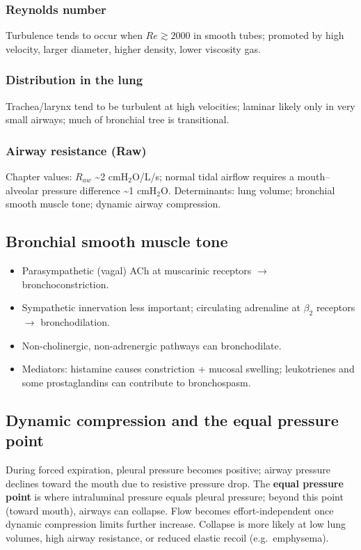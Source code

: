 \documentclass[11pt,a4paper]{article}
\begin{document}
\subsubsection{Reynolds number}
Turbulence tends to occur when $Re \gtrsim 2000$ in smooth tubes; promoted by high velocity, larger diameter, higher density, lower viscosity gas.

\subsubsection{Distribution in the lung}
Trachea/larynx tend to be turbulent at high velocities; laminar likely only in very small airways; much of bronchial tree is transitional.

\subsubsection{Airway resistance (Raw)}
Chapter values: $R_{aw}$ \textasciitilde 2 cmH$_2$O/L/s; normal tidal airflow requires a mouth--alveolar pressure difference \textasciitilde 1 cmH$_2$O.
Determinants: lung volume; bronchial smooth muscle tone; dynamic airway compression.

\subsection{Bronchial smooth muscle tone}
\begin{itemize}
  \item Parasympathetic (vagal) ACh at muscarinic receptors $\rightarrow$ bronchoconstriction.
  \item Sympathetic innervation less important; circulating adrenaline at $\beta_2$ receptors $\rightarrow$ bronchodilation.
  \item Non-cholinergic, non-adrenergic pathways can bronchodilate.
  \item Mediators: histamine causes constriction + mucosal swelling; leukotrienes and some prostaglandins can contribute to bronchospasm.
\end{itemize}

\subsection{Dynamic compression and the equal pressure point}
During forced expiration, pleural pressure becomes positive; airway pressure declines toward the mouth due to resistive pressure drop. The \textbf{equal pressure point} is where intraluminal pressure equals pleural pressure; beyond this point (toward mouth), airways can collapse.
Flow becomes effort-independent once dynamic compression limits further increase. Collapse is more likely at low lung volumes, high airway resistance, or reduced elastic recoil (e.g.\ emphysema).
\end{document}
